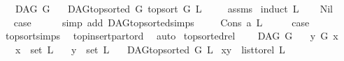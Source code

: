 \begin{isabellebody}
\ \ \ {\isachardoublequoteopen}DAG\ G{\isachardoublequoteclose}\isanewline
\ \ \ {\isachardoublequoteopen}DAG{\isachardot}{\kern0pt}top{\isacharunderscore}{\kern0pt}sorted\ G\ {\isacharparenleft}{\kern0pt}top{\isacharunderscore}{\kern0pt}sort\ G\ L{\isacharparenright}{\kern0pt}{\isachardoublequoteclose}\ \isanewline
%
\isadelimproof
\ \ %
\endisadelimproof
%
\isatagproof
{}\isamarkupfalse%
\ assms\ \isanewline
{}\isamarkupfalse%
{\isacharparenleft}{\kern0pt}induct\ L{\isacharparenright}{\kern0pt}\isanewline
\ \ \isamarkupfalse%
\ Nil\isanewline
\ \ \isamarkupfalse%
\ \isamarkupfalse%
\ {\isacharquery}{\kern0pt}case\isanewline
\ \ \ \ \isamarkupfalse%
\ {\isacharparenleft}{\kern0pt}simp\ add{\isacharcolon}{\kern0pt}\ DAG{\isachardot}{\kern0pt}top{\isacharunderscore}{\kern0pt}sorted{\isachardot}{\kern0pt}simps{\isacharparenleft}{\kern0pt}{}{\isacharparenright}{\kern0pt}{\isacharparenright}{\kern0pt}\ \isanewline
\ \ \isamarkupfalse%
\ {\isacharparenleft}{\kern0pt}Cons\ a\ L{\isacharparenright}{\kern0pt}\isanewline
\ \ \isamarkupfalse%
\ \isamarkupfalse%
\ {\isacharquery}{\kern0pt}case\ \isamarkupfalse%
\ top{\isacharunderscore}{\kern0pt}sort{\isachardot}{\kern0pt}simps\ \isamarkupfalse%
\ top{\isacharunderscore}{\kern0pt}insert{\isacharunderscore}{\kern0pt}part{\isacharunderscore}{\kern0pt}ord\ \isamarkupfalse%
\ auto\isanewline
{}\isamarkupfalse%
%
\endisatagproof
{\isafoldproof}%
%
\isadelimproof
\isanewline
%
\endisadelimproof
\isanewline
{}\isamarkupfalse%
\ top{\isacharunderscore}{\kern0pt}sorted{\isacharunderscore}{\kern0pt}rel{\isacharcolon}{\kern0pt}\ \isanewline
\ \ \ {\isachardoublequoteopen}DAG\ G{\isachardoublequoteclose}\isanewline
\ \ \ {\isachardoublequoteopen}y\ {\isasymrightarrow}\isactrlsup {\isacharplus}{\kern0pt}\isactrlbsub G\isactrlesub \ x{\isachardoublequoteclose}\isanewline
\ \ \ {\isachardoublequoteopen}x\ {\isasymin}\ set\ L{\isachardoublequoteclose}\isanewline
\ \ \ {\isachardoublequoteopen}y\ {\isasymin}\ set\ L{\isachardoublequoteclose}\isanewline
\ \ \ {\isachardoublequoteopen}DAG{\isachardot}{\kern0pt}top{\isacharunderscore}{\kern0pt}sorted\ G\ L{\isachardoublequoteclose}\isanewline
{}\ {\isachardoublequoteopen}{\isacharparenleft}{\kern0pt}x{\isacharcomma}{\kern0pt}y{\isacharparenright}{\kern0pt}\ {\isasymin}\ list{\isacharunderscore}{\kern0pt}to{\isacharunderscore}{\kern0pt}rel\ L{\isachardoublequoteclose}\isanewline

\end{isabellebody}
